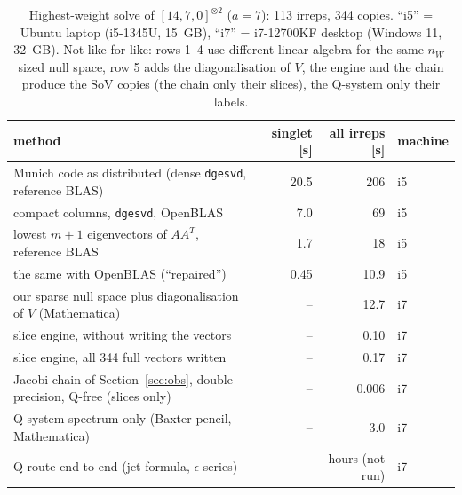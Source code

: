 \documentclass[11pt]{article}
\begin{document}
\begin{table}[htbp]
\centering\small
\caption{Highest-weight solve of $[14,7,0]^{\otimes2}$ ($a=7$): 113 irreps, 344 copies. ``i5'' = Ubuntu laptop (i5-1345U, 15~GB), ``i7'' = i7-12700KF desktop (Windows 11, 32~GB). Not like for like: rows 1--4 use different linear algebra for the same $n_W$-sized null space, row 5 adds the diagonalisation of $V$, the engine and the chain produce the SoV copies (the chain only their slices), the Q-system only their labels.}
\label{tab:bench}
\begin{tabular}{@{}lrrl@{}}
\toprule
method & singlet [s] & all irreps [s] & machine \\
\midrule
Munich code as distributed (dense \texttt{dgesvd}, reference BLAS) & 20.5 & 206 & i5 \\
\quad compact columns, \texttt{dgesvd}, OpenBLAS & 7.0 & 69 & i5 \\
\quad lowest $m+1$ eigenvectors of $AA^T$, reference BLAS & 1.7 & 18 & i5 \\
\quad the same with OpenBLAS (``repaired'') & 0.45 & 10.9 & i5 \\
our sparse null space plus diagonalisation of $V$ (Mathematica) & -- & 12.7 & i7 \\
slice engine, without writing the vectors & -- & 0.10 & i7 \\
slice engine, all 344 full vectors written & -- & 0.17 & i7 \\
Jacobi chain of Section~\ref{sec:obs}, double precision, Q-free (slices only) & -- & 0.006 & i7 \\
Q-system spectrum only (Baxter pencil, Mathematica) & -- & 3.0 & i7 \\
Q-route end to end (jet formula, $\epsilon$-series) & -- & hours (not run) & i7 \\
\bottomrule
\end{tabular}
\end{table}
\end{document}
